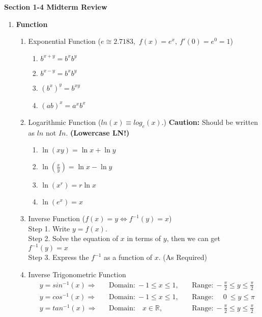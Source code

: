 \documentclass[12px]{article}
\begin{document}
\begin{center}
    \Large\textbf{Section 1-4 Midterm Review}
\end{center}
\begin{enumerate}
    \item \textbf{Function}
    \begin{enumerate}[(1)]
        \item Exponential Function ($e\cong 2.7183$,\ $f(x)=e^x,\ f'(0)=e^0=1$)
        \begin{multicols}{4}
            \begin{enumerate}
                \item $b^{x+y}=b^xb^y$
                \item $b^{x-y}={b^x}{b^y}$
                \item $(b^x)^y=b^{xy}$
                \item $(ab)^x=a^xb^x$
            \end{enumerate}
        \end{multicols}
        \item Logarithmic Function ($ln(x) \equiv log_e(x)$.) \textbf{Caution:} Should be written as $ln$ not $In$. \textbf{(Lowercase LN!)}
        \begin{multicols}{4}
            \begin{enumerate}
                \item $\ln(xy)=\ln{x}+\ln{y}$
                \item $\ln(\frac{x}{y})=\ln{x}-\ln{y}$
                \item $\ln(x^r)=r\ln{x}$
                \item $\ln(e^x)=x$
            \end{enumerate}
        \end{multicols}
        \item Inverse Function ($f(x)=y \Leftrightarrow f^{-1}(y)=x$)\\
        Step 1. Write $y=f(x)$.\\
        Step 2. Solve the equation of $x$ in terms of $y$, then we can get $f^{-1}(y)=x$\\
        Step 3. Express the $f^{-1}$ as a function of $x$. (As Required)
        \item Inverse Trigonometric Function
        \begin{align}
            &y = sin^{-1}(x) \Rightarrow &&\text{Domain:}\ -1 \leq x \leq 1,\ &&\text{Range:}\ -\frac{\pi}{2}\leq y \leq\frac{\pi}{2}\nonumber\\
            &y = cos^{-1}(x) \Rightarrow &&\text{Domain:}\ -1 \leq x \leq 1,\ &&\text{Range:}\quad\ \,0\ \leq y \leq\pi\nonumber\\
            &y = tan^{-1}(x) \Rightarrow &&\text{Domain:}\quad x\in \mathbb{R},\ &&\text{Range:}\ -\frac{\pi}{2} \leq y \leq \frac{\pi}{2} \nonumber
        \end{align}
    \end{enumerate}



\end{enumerate}
\end{document}
